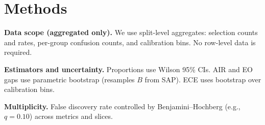 
\section{Methods}
\textbf{Data scope (aggregated only).} We use split-level aggregates: selection counts and rates, per-group confusion counts, and calibration bins. No row-level data is required.

\textbf{Estimators and uncertainty.} Proportions use Wilson 95\% CIs. AIR and EO gaps use parametric bootstrap (resamples $B$ from SAP). ECE uses bootstrap over calibration bins.

\textbf{Multiplicity.} False discovery rate controlled by Benjamini--Hochberg (e.g., $q=0.10$) across metrics and slices.
